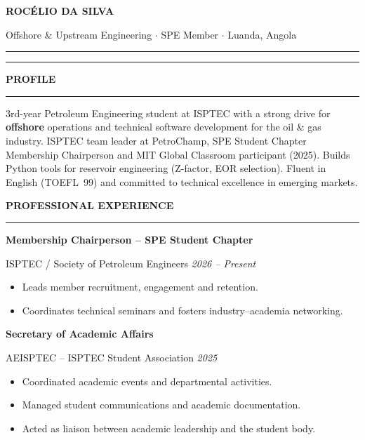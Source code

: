 \documentclass[10pt,a4paper]{article}
\newcommand{\mainSection}[1]{%
  \vspace{4pt}%
  {\bfseries\color{navy}\large\MakeUppercase{#1}}%
  \par\vspace{0pt}%
  {\color{navy}\rule{\linewidth}{1.0pt}}%
  \par\vspace{2pt}%
}
\newcommand{\expEntry}[3]{%
  {\bfseries\color{navy}\normalsize #1}\par\vspace{1pt}%
  {\color{mutedtext}\small #2 \hfill \textit{\color{navylt}#3}}\par\vspace{1pt}%
}
\begin{document}
\begin{minipage}[t]{\dimexpr 0.705\paperwidth - 26pt}
  \color{bodytext}
  \setlength{\parskip}{2pt}

  \vspace{5pt}

  {\huge\bfseries\color{navy} ROCÉLIO DA SILVA}\par
  \vspace{2pt}
  {\normalsize\color{mutedtext}
    Offshore \& Upstream Engineering
    $\cdot$ SPE Member
    $\cdot$ Luanda, Angola
  }\par
  \vspace{2pt}
  {\color{navy}\rule{\linewidth}{1.2pt}}\par
  \vspace{1pt}
  {\color{goldrule}\rule{\linewidth}{0.4pt}}

  \mainSection{Profile}
  3rd-year Petroleum Engineering student at ISPTEC with a strong drive for
  \textbf{offshore} operations and technical software development for the oil \& gas
  industry. ISPTEC team leader at PetroChamp, SPE Student Chapter Membership
  Chairperson and MIT Global Classroom participant (2025). Builds Python tools for
  reservoir engineering (Z-factor, EOR selection). Fluent in English (TOEFL~99)
  and committed to technical excellence in emerging markets.

  \mainSection{Professional Experience}

  \expEntry{Membership Chairperson -- SPE Student Chapter}%
           {ISPTEC / Society of Petroleum Engineers}%
           {2026 -- Present}
  \begin{itemize}
    \item Leads member recruitment, engagement and retention.
    \item Coordinates technical seminars and fosters industry--academia networking.
  \end{itemize}

  \vspace{3pt}
  \expEntry{Secretary of Academic Affairs}%
           {AEISPTEC -- ISPTEC Student Association}%
           {2025}
  \begin{itemize}
    \item Coordinated academic events and departmental activities.
    \item Managed student communications and academic documentation.
    \item Acted as liaison between academic leadership and the student body.
  \end{itemize}


\end{minipage}
\end{document}
